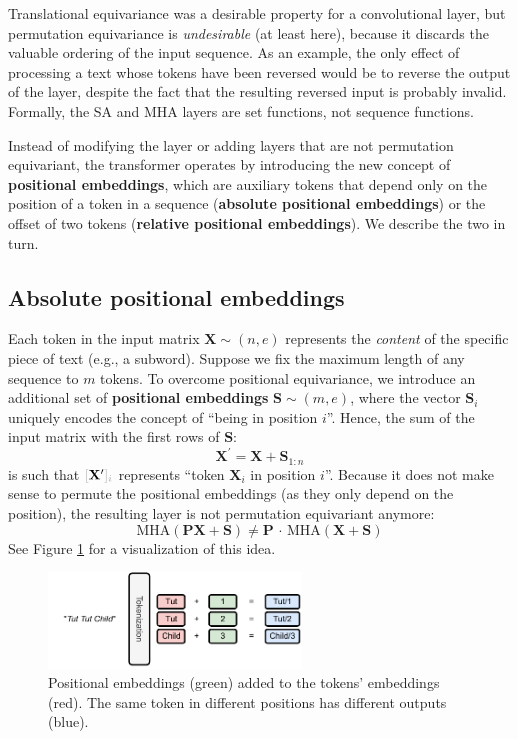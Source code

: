 Translational equivariance was a desirable property for a convolutional layer, but permutation equivariance is \textit{undesirable} (at least here), because it discards the valuable ordering of the input sequence. As an example, the only effect of processing a text whose tokens have been reversed would be to reverse the output of the layer, despite the fact that the resulting reversed input is probably invalid. Formally, the SA and MHA layers are set functions, not sequence functions.

Instead of modifying the layer or adding layers that are not permutation equivariant, the transformer operates by introducing the new concept of \textbf{positional embeddings}, which are auxiliary tokens that depend only on the position of a token in a sequence (\textbf{absolute positional embeddings}) or the offset of two tokens (\textbf{relative positional embeddings}). We describe the two in turn.

\subsection{Absolute positional embeddings}

Each token in the input matrix $\mathbf{X} \sim (n,e)$ represents the \textit{content} of the specific piece of text (e.g., a subword). Suppose we fix the maximum length of any sequence to $m$ tokens. To overcome positional equivariance, we introduce an additional set of \textbf{positional embeddings} $\mathbf{S} \sim (m,e)$, where the vector $\mathbf{S}_i$ uniquely encodes the concept of “being in position $i$”. Hence, the sum of the input matrix with the first rows of $\mathbf{S}$:
%
$$
\mathbf{X}^\prime =  \mathbf{X} + \mathbf{S}_{1:n}
$$
%
is such that $\idx{\mathbf{X}^\prime}{i}$ represents “token $\mathbf{X}_i$ in position $i$”.
%
Because it does not make sense to permute the positional embeddings (as they only depend on the position), the resulting layer is not permutation equivariant anymore:
%
$$
\text{MHA}(\mathbf{P}\mathbf{X} + \mathbf{S}) \neq \mathbf{P}\,\cdot\,\text{MHA}(\mathbf{X}+\mathbf{S})
$$
%
See Figure \ref{fig:positional_embeddings} for a visualization of this idea. 

\begin{figure}
    \centering
    \includegraphics[width=0.6\textwidth]{images/positional_embeddings}
    \caption{Positional embeddings (\colorbox{drawgreen!30}{green}) added to the  tokens' embeddings (\colorbox{drawred!30}{red}). The same token in different positions has different outputs (\colorbox{drawblue!30}{blue}).}
    \label{fig:positional_embeddings}
\end{figure}

